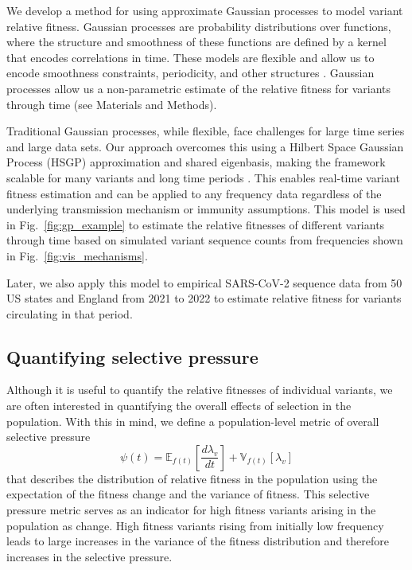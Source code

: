 \documentclass[11pt,oneside,letterpaper]{article}
\newcommand{\Expect}{\mathbb{E}}
\newcommand{\Var}{\mathbb{V}}
\begin{document}
We develop a method for using approximate Gaussian processes to model variant relative fitness.
Gaussian processes are probability distributions over functions, where the structure and smoothness of these functions are defined by a kernel that encodes correlations in time.
These models are flexible and allow us to encode smoothness constraints, periodicity, and other structures \cite{Gortler2019a}.
Gaussian processes allow us a non-parametric estimate of the relative fitness for variants through time (see Materials and Methods).

Traditional Gaussian processes, while flexible, face challenges for large time series and large data sets.
Our approach overcomes this using a Hilbert Space Gaussian Process (HSGP) approximation and shared eigenbasis, making the framework scalable for many variants and long time periods \cite{riutortmayol2022practical}.
This enables real-time variant fitness estimation and can be applied to any frequency data regardless of the underlying transmission mechanism or immunity assumptions.
This model is used in Fig.~\ref{fig:gp_example} to estimate the relative fitnesses of different variants through time based on simulated variant sequence counts from frequencies shown in Fig.~\ref{fig:vis_mechanisms}.

Later, we also apply this model to empirical SARS-CoV-2 sequence data from 50 US states and England from 2021 to 2022 to estimate relative fitness for variants circulating in that period.

\subsection*{Quantifying selective pressure}

Although it is useful to quantify the relative fitnesses of individual variants, we are often interested in quantifying the overall effects of selection in the population.
With this in mind, we define a population-level metric of overall selective pressure
\begin{equation}
\psi(t) =  \Expect_{f(t)}\left[ \frac{d \lambda_v}{d t}\right] +  \Var_{f(t)}[\lambda_{v}]
\end{equation}
that describes the distribution of relative fitness in the population using the expectation of the fitness change and the variance of fitness.
This selective pressure metric serves as an indicator for high fitness variants arising in the population as change.
High fitness variants rising from initially low frequency leads to large increases in the variance of the fitness distribution and therefore increases in the selective pressure.
\end{document}
